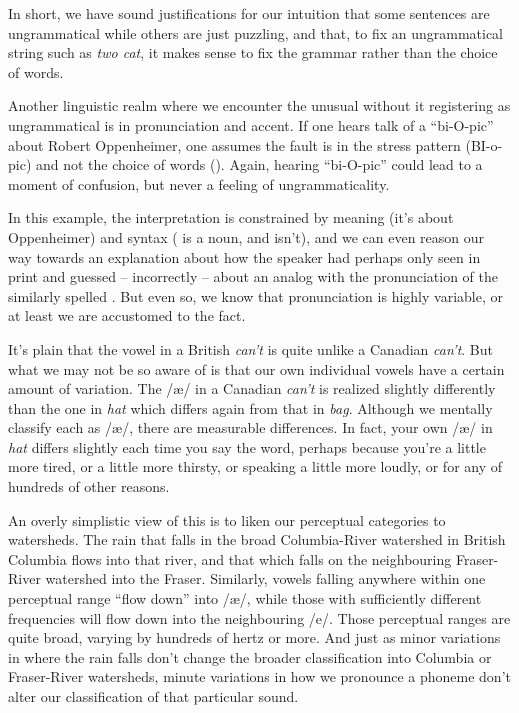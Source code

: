 In short, we have sound justifications for our intuition that some sentences are ungrammatical while others are just puzzling, and that, to fix an ungrammatical string such as \textit{two cat}, it makes sense to fix the grammar rather than the choice of words.

\bigskip

Another linguistic realm where we encounter the unusual without it registering as ungrammatical is in pronunciation and accent. If one hears talk of a \enquote{bi-O-pic} about Robert Oppenheimer, one assumes the fault is in the stress pattern (BI-o-pic) and not the choice of words (). Again, hearing \enquote{bi-O-pic} could lead to a moment of confusion, but never a feeling of ungrammaticality.

In this example, the interpretation is constrained by meaning (it's about Oppenheimer) and syntax ( is a noun, and  isn't), and we can even reason our way towards an explanation about how the speaker had perhaps only seen  in print and guessed -- incorrectly -- about an analog with the pronunciation of the similarly spelled . But even so, we know that pronunciation is highly variable, or at least we are accustomed to the fact.

It's plain that the vowel in a British \textit{can't} is quite unlike a Canadian \textit{can't}. But what we may not be so aware of is that our own individual vowels have a certain amount of variation. The /æ/ in a Canadian \textit{can't} is realized slightly differently than the one in \textit{hat} which differs again from that in \textit{bag}. Although we mentally classify each as /æ/, there are measurable differences. In fact, your own /æ/ in \textit{hat} differs slightly each time you say the word, perhaps because you're a little more tired, or a little more thirsty, or speaking a little more loudly, or for any of hundreds of other reasons.

An overly simplistic view of this is to liken our perceptual categories to watersheds. The rain that falls in the broad Columbia-River watershed in British Columbia flows into that river, and that which falls on the neighbouring Fraser-River watershed into the Fraser. Similarly, vowels falling anywhere within one perceptual range \enquote{flow down} into /æ/, while those with sufficiently different frequencies will flow down into the neighbouring /e/. Those perceptual ranges are quite broad, varying by hundreds of hertz or more. And just as minor variations in where the rain falls don't change the broader classification into Columbia or Fraser-River watersheds,  minute variations in how we pronounce a phoneme don't alter our classification of that particular sound.

